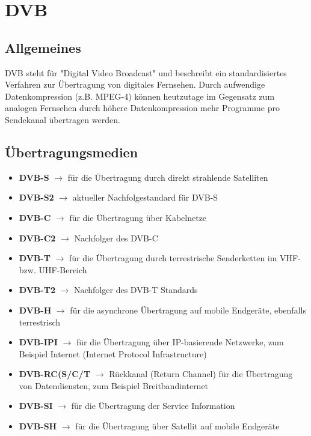 \documentclass[a4paper]{article}
\begin{document}
\section{DVB}

\subsection{Allgemeines}

DVB steht für "Digital Video Broadcast" und beschreibt ein standardisiertes Verfahren zur Übertragung von digitales Fernsehen. Durch aufwendige Datenkompression (z.B. MPEG-4) können heutzutage im Gegensatz zum analogen Fernsehen durch höhere Datenkompression mehr Programme pro Sendekanal übertragen werden.

\subsection{Übertragungsmedien}

\begin{itemize}
\item \textbf{DVB-S} $\rightarrow$ für die Übertragung durch direkt strahlende Satelliten 
\item \textbf{DVB-S2} $\rightarrow$ aktueller Nachfolgestandard für DVB-S
\item \textbf{DVB-C} $\rightarrow$ für die Übertragung über Kabelnetze
\item \textbf{DVB-C2} $\rightarrow$ Nachfolger des DVB-C
\item \textbf{DVB-T} $\rightarrow$ für die Übertragung durch terrestrische Senderketten im VHF- bzw. UHF-Bereich
\item \textbf{DVB-T2} $\rightarrow$ Nachfolger des DVB-T Standards
\item \textbf{DVB-H} $\rightarrow$ für die asynchrone Übertragung auf mobile Endgeräte, ebenfalls terrestrisch
\item \textbf{DVB-IPI} $\rightarrow$ für die Übertragung über IP-basierende Netzwerke, zum Beispiel Internet (Internet Protocol Infrastructure)
\item \textbf{DVB-RC(S/C/T} $\rightarrow$ Rückkanal (Return Channel) für die Übertragung von Datendiensten, zum Beispiel Breitbandinternet
\item \textbf{DVB-SI} $\rightarrow$ für die Übertragung der Service Information
\item \textbf{DVB-SH} $\rightarrow$ für die Übertragung über Satellit auf mobile Endgeräte
\end{itemize}
\end{document}
